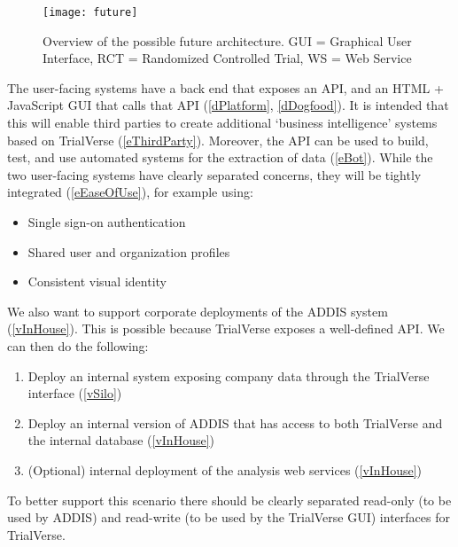 \documentclass[a4paper]{article}
\begin{document}
\begin{figure}[h]
\centering
\texttt{[image: future]}
\caption{Overview of the possible future architecture. GUI = Graphical User Interface, RCT = Randomized Controlled Trial, WS = Web Service}
\end{figure}

The user-facing systems have a back end that exposes an API, and an HTML + JavaScript GUI that calls that API (\ref{dPlatform}, \ref{dDogfood}).
It is intended that this will enable third parties to create additional `business intelligence' systems based on TrialVerse (\ref{eThirdParty}).
Moreover, the API can be used to build, test, and use automated systems for the extraction of data (\ref{eBot}).
While the two user-facing systems have clearly separated concerns, they will be tightly integrated (\ref{eEaseOfUse}), for example using:
\begin{itemize}
\item Single sign-on authentication
\item Shared user and organization profiles
\item Consistent visual identity
\end{itemize}

We also want to support corporate deployments of the ADDIS system (\ref{vInHouse}). This is possible because TrialVerse exposes a well-defined API. We can then do the following:
\begin{enumerate}
\item Deploy an internal system exposing company data through the TrialVerse interface (\ref{vSilo})
\item Deploy an internal version of ADDIS that has access to both TrialVerse and the internal database (\ref{vInHouse})
\item (Optional) internal deployment of the analysis web services (\ref{vInHouse})
\end{enumerate}
To better support this scenario there should be clearly separated read-only (to be used by ADDIS) and read-write (to be used by the TrialVerse GUI) interfaces for TrialVerse.
\end{document}
